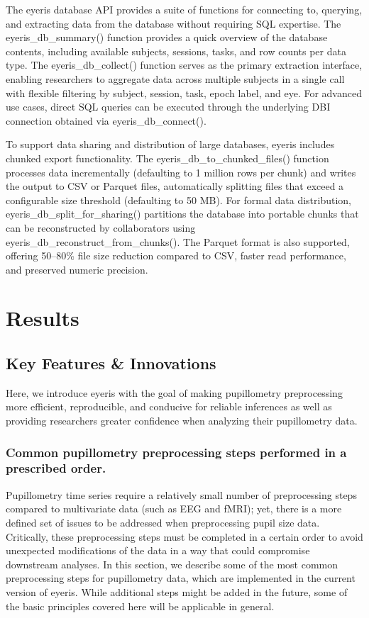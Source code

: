 The eyeris database API provides a suite of functions for connecting to, querying, and extracting data from the database without requiring SQL expertise. The eyeris\_db\_summary() function provides a quick overview of the database contents, including available subjects, sessions, tasks, and row counts per data type. The eyeris\_db\_collect() function serves as the primary extraction interface, enabling researchers to aggregate data across multiple subjects in a single call with flexible filtering by subject, session, task, epoch label, and eye. For advanced use cases, direct SQL queries can be executed through the underlying DBI connection obtained via eyeris\_db\_connect().

To support data sharing and distribution of large databases, eyeris includes chunked export functionality. The eyeris\_db\_to\_chunked\_files() function processes data incrementally (defaulting to 1 million rows per chunk) and writes the output to CSV or Parquet files, automatically splitting files that exceed a configurable size threshold (defaulting to 50 MB). For formal data distribution, eyeris\_db\_split\_for\_sharing() partitions the database into portable chunks that can be reconstructed by collaborators using eyeris\_db\_reconstruct\_from\_chunks(). The Parquet format is also supported, offering 50–80\% file size reduction compared to CSV, faster read performance, and preserved numeric precision.

\section{Results}
\subsection{Key Features \& Innovations}
Here, we introduce eyeris with the goal of making pupillometry preprocessing more efficient, reproducible, and conducive for reliable inferences as well as providing researchers greater confidence when analyzing their pupillometry data.

\subsubsection{Common pupillometry preprocessing steps performed in a prescribed order.}\label{sec:preproc-steps}
Pupillometry time series require a relatively small number of preprocessing steps compared to multivariate data (such as EEG and fMRI); yet, there is a more defined set of issues to be addressed when preprocessing pupil size data. Critically, these preprocessing steps must be completed in a certain order to avoid unexpected modifications of the data in a way that could compromise downstream analyses. In this section, we describe some of the most common preprocessing steps for pupillometry data, which are implemented in the current version of eyeris. While additional steps might be added in the future, some of the basic principles covered here will be applicable in general.

